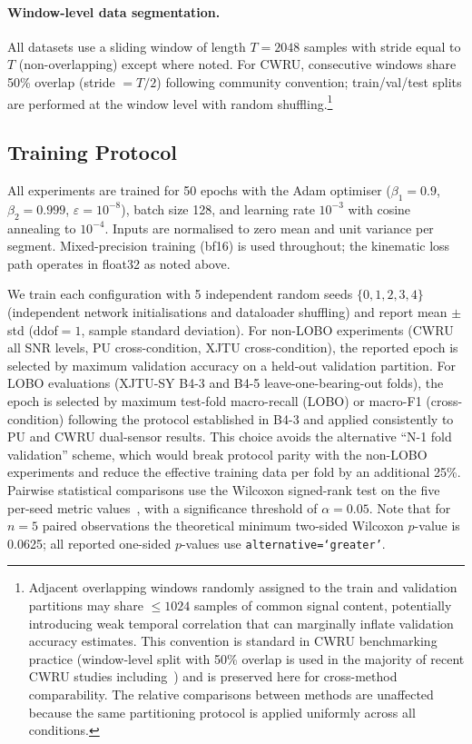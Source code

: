 \paragraph{Window-level data segmentation.}
All datasets use a sliding window of length $T = 2048$ samples with stride
equal to $T$ (non-overlapping) except where noted.
For CWRU, consecutive windows share 50\% overlap (stride $= T/2$)
following community convention; train/val/test splits are performed at the
window level with random shuffling.\footnote{Adjacent overlapping windows
randomly assigned to the train and validation partitions may share
$\leq 1024$ samples of common signal content, potentially introducing
weak temporal correlation that can marginally inflate validation accuracy
estimates. This convention is standard in CWRU benchmarking practice
(window-level split with 50\% overlap is used in the majority of recent
CWRU studies including~\cite{zhang2020deep,wen2018new}) and is
preserved here for cross-method comparability. The relative comparisons
between methods are unaffected because the same partitioning protocol
is applied uniformly across all conditions.}


\subsection{Training Protocol}
\label{subsec:train}

All experiments are trained for 50 epochs with the Adam optimiser
($\beta_1=0.9$, $\beta_2=0.999$, $\varepsilon=10^{-8}$),
batch size 128, and learning rate $10^{-3}$ with cosine annealing to $10^{-4}$.
Inputs are normalised to zero mean and unit variance per segment.
Mixed-precision training (bf16) is used throughout; the kinematic loss path
operates in float32 as noted above.

We train each configuration with 5 independent random seeds $\{0,1,2,3,4\}$
(independent network initialisations and dataloader shuffling)
and report mean $\pm$ std (ddof$=1$, sample standard deviation).
For non-LOBO experiments (CWRU all SNR levels, PU cross-condition,
XJTU cross-condition), the reported epoch is selected by maximum
validation accuracy on a held-out validation partition.
For LOBO evaluations (XJTU-SY B4-3 and B4-5 leave-one-bearing-out folds),
the epoch is selected by maximum test-fold macro-recall (LOBO) or
macro-F1 (cross-condition) following the protocol established in
B4-3 and applied consistently to PU and CWRU dual-sensor results.
This choice avoids the alternative ``N-1 fold validation'' scheme,
which would break protocol parity with the non-LOBO experiments and
reduce the effective training data per fold by an additional 25\%.
Pairwise statistical comparisons use the Wilcoxon signed-rank test
on the five per-seed metric values~\cite{wilcoxon_1945},
with a significance threshold of $\alpha = 0.05$.
Note that for $n=5$ paired observations the theoretical minimum two-sided
Wilcoxon $p$-value is 0.0625; all reported one-sided $p$-values use
\texttt{alternative=`greater'}.

